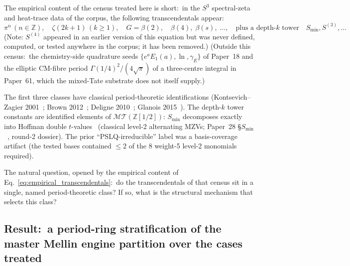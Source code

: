 \documentclass[11pt,a4paper]{article}
\theoremstyle{plain}
\theoremstyle{definition}
\newcommand{\sthree}{S^{3}}
\newcommand{\Z}{\mathbb{Z}}
\newcommand{\MT}{\mathcal{MT}}
\begin{document}
The empirical content of the census treated here is short:\ in the
$\sthree$ spectral-zeta and heat-trace data of the corpus, the
following transcendentals appear:\
\begin{equation}
\label{eq:empirical_transcendentals}
\pi^{n}\,(n \in \Z), \quad
\zeta(2k+1)\,(k \ge 1), \quad
G = \beta(2), \quad
\beta(4),\;\beta(s),\;\ldots,
\quad\text{plus a depth-}k\text{ tower}\quad
S_{\min}, S^{(3)}, \ldots
\end{equation}
(Note: $S^{(4)}$ appeared in an earlier version of this equation but was
never defined, computed, or tested anywhere in the corpus; it has been removed.)
(Outside this census:\ the chemistry-side quadrature seeds
$\{e^a E_1(a), \ln, \gamma_E\}$ of Paper~18 and the elliptic CM-fibre
period $\Gamma(1/4)^2/(4\sqrt\pi)$ of a three-centre integral in
Paper~61, which the mixed-Tate substrate does not itself supply.)

The first three classes have classical period-theoretic
identifications (Kontsevich--Zagier 2001~\cite{kontsevich_zagier2001};
Brown 2012~\cite{brown2012}; Deligne 2010~\cite{deligne2010};
Glanois 2015~\cite{glanois2015}).  The depth-$k$ tower constants are
identified elements of $\MT(\Z[1/2])$: $S_{\min}$ decomposes exactly
into Hoffman double $t$-values~\cite{hoffman2019odd} (classical level-2
alternating MZVs; Paper~28 \S{$S_{\min}$}~\cite{loutey_paper28},
round-2 dossier).  The prior ``PSLQ-irreducible'' label was a
basis-coverage artifact (the tested bases contained $\le 2$ of the
8 weight-5 level-2 monomials required).

The natural question, opened by the empirical content of
Eq.~\eqref{eq:empirical_transcendentals}:\ do the transcendentals of
that census sit in a single, named period-theoretic class?  If so,
what is the structural mechanism that selects this class?

\subsection{Result:\ a period-ring stratification of the master Mellin
engine partition over the cases treated}
\end{document}
